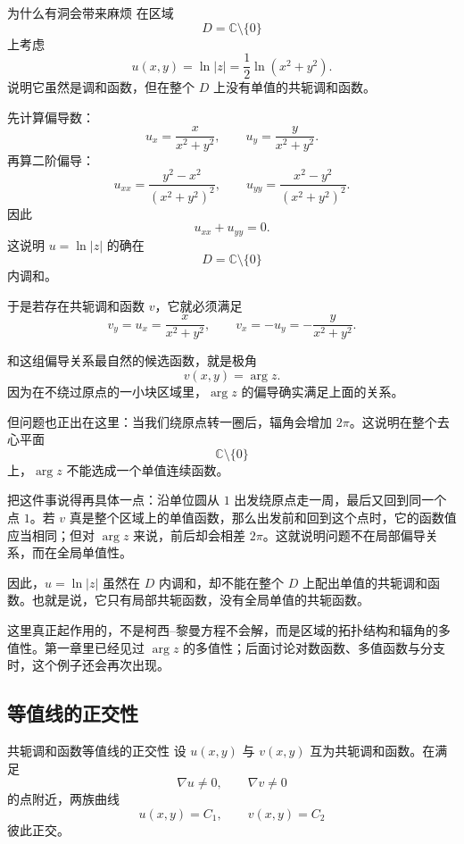 \begin{lizi}{为什么有洞会带来麻烦}{}
在区域
\[
    D=\mathbb{C}\setminus\{0\}
\]
上考虑
\[
    u(x,y)=\ln|z|=\frac{1}{2}\ln(x^2+y^2).
\]
说明它虽然是调和函数，但在整个 $D$ 上没有单值的共轭调和函数。

\begin{jie}
先计算偏导数：
\[
    u_x=\frac{x}{x^2+y^2},\qquad u_y=\frac{y}{x^2+y^2}.
\]
再算二阶偏导：
\[
    u_{xx}=\frac{y^2-x^2}{(x^2+y^2)^2},\qquad
    u_{yy}=\frac{x^2-y^2}{(x^2+y^2)^2}.
\]
因此
\[
    u_{xx}+u_{yy}=0.
\]
这说明 $u=\ln|z|$ 的确在
\[
    D=\mathbb{C}\setminus\{0\}
\]
内调和。

于是若存在共轭调和函数 $v$，它就必须满足
\[
    v_y=u_x=\frac{x}{x^2+y^2},\qquad
    v_x=-u_y=-\frac{y}{x^2+y^2}.
\]

和这组偏导关系最自然的候选函数，就是极角
\[
    v(x,y)=\arg z.
\]
因为在不绕过原点的一小块区域里，$\arg z$ 的偏导确实满足上面的关系。

但问题也正出在这里：当我们绕原点转一圈后，辐角会增加 $2\pi$。这说明在整个去心平面
\[
    \mathbb{C}\setminus\{0\}
\]
上，$\arg z$ 不能选成一个单值连续函数。

把这件事说得再具体一点：沿单位圆从 $1$ 出发绕原点走一周，最后又回到同一个点 $1$。若 $v$ 真是整个区域上的单值函数，那么出发前和回到这个点时，它的函数值应当相同；但对 $\arg z$ 来说，前后却会相差 $2\pi$。这就说明问题不在局部偏导关系，而在全局单值性。

因此，$u=\ln|z|$ 虽然在 $D$ 内调和，却不能在整个 $D$ 上配出单值的共轭调和函数。也就是说，它只有局部共轭函数，没有全局单值的共轭函数。
\end{jie}
\end{lizi}

\begin{tishi}
这里真正起作用的，不是柯西--黎曼方程不会解，而是区域的拓扑结构和辐角的多值性。第一章里已经见过 $\arg z$ 的多值性；后面讨论对数函数、多值函数与分支时，这个例子还会再次出现。
\end{tishi}

\subsection{等值线的正交性}

\begin{dingli}{共轭调和函数等值线的正交性}{}
设 $u(x,y)$ 与 $v(x,y)$ 互为共轭调和函数。在满足
\[
    \nabla u\neq 0,\qquad \nabla v\neq 0
\]
的点附近，两族曲线
\[
    u(x,y)=C_1,\qquad v(x,y)=C_2
\]
彼此正交。
\end{dingli}

